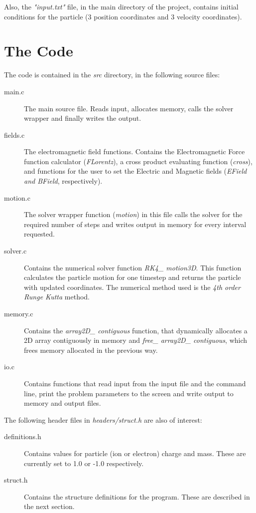 \documentclass[11pt]{report}
\begin{document}
Also, the \emph{"input.txt"} file, in the main directory of the project, contains initial conditions for the particle (3 position coordinates and 3 velocity coordinates).

\section{The Code}
The code is contained in the \emph{src} directory, in the following source files:

\begin{description}
\item[main.c] The main source file. Reads input, allocates memory, calls the solver wrapper and finally writes the output.
\item[fields.c] The electromagnetic field functions. Contains the Electromagnetic Force function calculator (\emph{FLorentz}), a cross product evaluating function (\emph{cross}), and functions for the user to set the Electric and Magnetic fields (\emph{EField and BField}, respectively).
\item[motion.c] The solver wrapper function (\emph{motion}) in this file calls the solver for the required number of steps and writes output in memory for every interval requested.
\item[solver.c] Contains the numerical solver function \emph{RK4\_ motion3D}. This function calculates the particle motion for one timestep and returns the particle with updated coordinates. The numerical method used is the \emph{4th order Runge Kutta} method.
\item[memory.c] Contains the \emph{array2D\_ contiguous} function, that dynamically allocates a 2D array contiguously in memory and \emph{free\_ array2D\_ contiguous}, which frees memory allocated in the previous way.
\item[io.c] Contains functions that read input from the input file and the command line, print the problem parameters to the screen and write output to memory and output files.
\end{description}

The following header files in \emph{headers/struct.h} are also of interest:
\begin{description}
\item[definitions.h] Contains values for particle (ion or electron) charge and mass. These are currently set to 1.0 or -1.0 respectively.
\item[struct.h] Contains the structure definitions for the program. These are described in the next section.
\end{description}
\newpage
\end{document}
